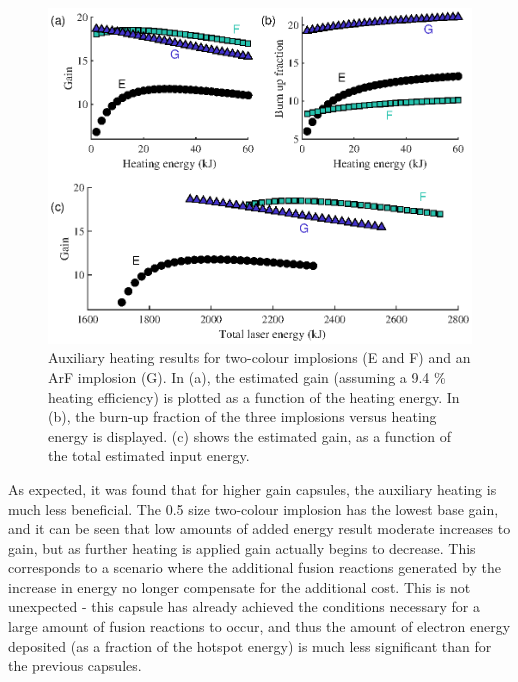 \begin{figure}[ht]
\centering
\includegraphics{figures/FurtherSims/TwoColourAux.eps}
\caption{Auxiliary heating results for two-colour implosions (E and F) and an ArF implosion (G). In (a), the estimated gain (assuming a 9.4 \% heating efficiency) is plotted as a function of the heating energy. In (b), the burn-up fraction of the three implosions versus heating energy is displayed. (c) shows the estimated gain, as a function of the total estimated input energy.}
\label{fig:TwoColourAux}
\end{figure}

As expected, it was found that for higher gain capsules, the auxiliary heating is much less beneficial. The 0.5 size two-colour implosion has the lowest base gain, and it can be seen that low amounts of added energy result moderate increases to gain, but as further heating is applied gain actually begins to decrease. This corresponds to a scenario where the additional fusion reactions generated by the increase in energy no longer compensate for the additional cost. This is not unexpected - this capsule has already achieved the conditions necessary for a large amount of fusion reactions to occur, and thus the amount of electron energy deposited (as a fraction of the hotspot energy) is much less significant than for the previous capsules.

